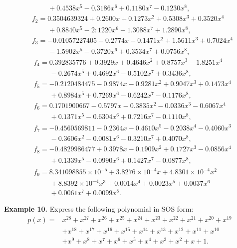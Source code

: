 \documentclass[runningheads]{llncs}
\begin{document}
{\begin{align*}
&\phantom{xxxx} + 0.4538  x^5 - 0.3186  x^6 + 0.1180  x^7 - 0.1230  x^8,\\
&f_2 = 0.3504639324 + 0.2600  x + 0.1273  x^2 + 0.5308  x^3+ 0.3520  x^4\\
&\phantom{xxxx} + 0.8840  x^5- 2:1220  x^6 - 1.3088  x^7 + 1.2890  x^8,\\
&f_3 = -0.01057227405 - 0.2774  x - 0.1471  x^2 + 1.5611  x^3+ 0.7024  x^4\\
&\phantom{xxxx} - 1.5902  x^5- 0.3720  x^6 + 0.3534  x^7 + 0.0756  x^8,
\end{align*}
\begin{align*}
&f_4 = 0.392835776 + 0.3929  x+ 0.4646  x^2 + 0.8757  x^3- 1.8251  x^4\\
&\phantom{xxxx} - 0.2674  x^5 + 0.4692  x^6 - 0.5102  x^7 + 0.3436  x^8,\\
&f_5 = -0.2120484475 - 0.9874  x- 0.9281  x^2 + 0.9047  x^3+ 0.1473  x^4\\
&\phantom{xxxx}+ 0.8984  x^5 + 0.7269  x^6 - 0.6242  x^7 - 0.1176  x^8,\\
&f_6 = 0.1701900667 - 0.5797  x- 0.3835  x^2 - 0.0336  x^3- 0.6067  x^4\\
&\phantom{xxxx} + 0.1371  x^5- 0.6304  x^6 + 0.7216  x^7 - 0.1110  x^8,\\
&f_7 = -0.4560569811 - 0.2364  x - 0.4610  x^5 - 0.2038  x^4 - 0.4060  x^3\\
&\phantom{xxxx}- 0.3606  x^2 - 0.0081  x^6 - 0.3210  x^7 + 0.4070  x^8,\\
&f_8 = -0.4829986477 + 0.3978  x- 0.1909  x^2 + 0.1727  x^3- 0.0856  x^4\\
&\phantom{xxxx}+ 0.1339  x^5 - 0.0990  x^6 + 0.1427  x^7 - 0.0877  x^8,\\
&f_9 = 8.341098855\times 10^{- 5} + 3.8276\times 10^{- 4}  x + 4.8301\times 10^{- 4}  x^2 \\
&\phantom{xxxx}+ 8.8392\times 10^{- 4}  x^3+ 0.0014  x^4+ 0.0023  x^5+ 0.0037  x^6 \\
&\phantom{xxxx}+ 0.0061  x^7 + 0.0099  x^8.
\end{align*}

{\bf Example 10. } Express the following polynomial in SOS form: 
\begin{align*}
p(x)=&{x}^{28}+{x}^{27}+{x}^{26}+{x}^{25}+{x}^{24}+{x}^{23}+{x}^{22}+{x}^{21
}+{x}^{20}+{x}^{19}
\\
&
+{x}^{18}+{x}^{17}+{x}^{16}+{x}^{15}+{x}^{14}+{x}^{
13}+{x}^{12}+{x}^{11}+{x}^{10}
\\
&+{x}^{9}+{x}^{8}+{x}^{7}+{x}^{6}+{x}^{5}
+{x}^{4}+{x}^{3}+{x}^{2}+x+1.
\end{align*}

}
\end{document}
